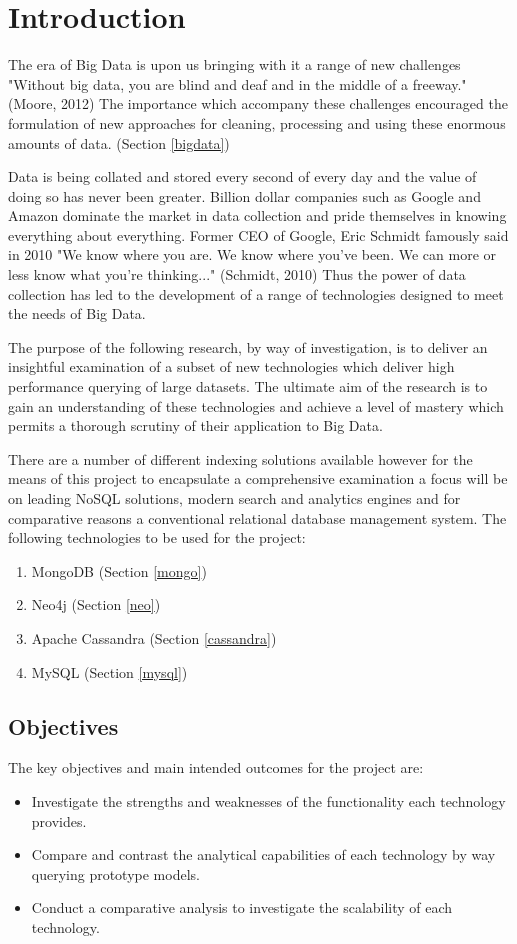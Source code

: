 \chapter{Introduction}\label{intro}
The era of Big Data is upon us bringing with it a range of new challenges "Without big data, you are blind and deaf and in the middle of a freeway." (Moore, 2012) The importance which accompany these challenges encouraged the formulation of new approaches for cleaning, processing and using these enormous amounts of data. (Section \ref{bigdata})

Data is being collated and stored every second of every day and the value of doing so has never been greater. Billion dollar companies such as Google and Amazon dominate the market in data collection and pride themselves in knowing everything about everything. Former CEO of Google, Eric Schmidt famously said in 2010 "We know where you are. We know where you've been. We can more or less know what you're thinking..." (Schmidt, 2010) Thus the power of data collection has led to the development of a range of technologies designed to meet the needs of Big Data.

The purpose of the following research, by way of investigation, is to deliver an insightful examination of a subset of new technologies which deliver high performance querying of large datasets. The ultimate aim of the research is to gain an understanding of these technologies and achieve a level of mastery which permits a thorough scrutiny of their application to Big Data.

There are a number of different indexing solutions available however for the means of this project to encapsulate a comprehensive examination a focus will be on leading NoSQL solutions, modern search and analytics engines and for comparative reasons a conventional relational database management system. The following technologies to be used for the project: 
\begin{enumerate}
\item MongoDB (Section \ref{mongo})
\item Neo4j (Section \ref{neo})
\item Apache Cassandra (Section \ref{cassandra})
\item MySQL (Section \ref{mysql})
\end{enumerate}

\section{Objectives}
The key objectives and main intended outcomes for the project are:
\begin{itemize}
\item Investigate the strengths and weaknesses of the functionality each technology provides.
\item Compare and contrast the analytical capabilities of each technology by way querying prototype models.
\item Conduct a comparative analysis to investigate the scalability of each technology.
\end{itemize}

